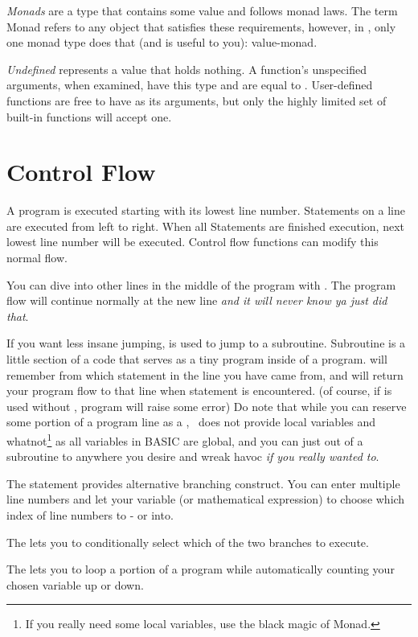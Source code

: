 \emph{Monads} are a type that contains some value and follows monad laws. The term Monad refers to any object that satisfies these requirements, however, in \tbas, only one monad type does that (and is useful to you): value-monad.

\emph{Undefined} represents a value that holds nothing. A function's unspecified arguments, when examined, have this type and are equal to . User-defined functions are free to have  as its arguments, but only the highly limited set of built-in functions will accept one.

\section{Control Flow}

A program is executed starting with its lowest line number. Statements on a line are executed from left to right. When all Statements are finished execution, next lowest line number will be executed. Control flow functions can modify this normal flow.

You can dive into other lines in the middle of the program with . The program flow will continue normally at the new line \emph{and it will never know ya just did that}.

If you want less insane jumping,  is used to jump to a subroutine. Subroutine is a little section of a code that serves as a tiny program inside of a program.  will remember from which statement in the line you have came from, and will return your program flow to that line when  statement is encountered. (of course, if  is used without , program will raise some error) Do note that while you can reserve some portion of a program line as a , \tbas\ does not provide local variables and whatnot\footnote{If you really need some local variables, use the black magic of Monad.} as all variables in BASIC are global, and you can just  out of a subroutine to anywhere you desire and wreak havoc \emph{if you really wanted to}.

The  statement provides alternative branching construct. You can enter multiple line numbers and let your variable (or mathematical expression) to choose which index of line numbers to - or  into.

The  lets you to conditionally select which of the two branches to execute.

The  lets you to loop a portion of a program while automatically counting your chosen variable up or down.
